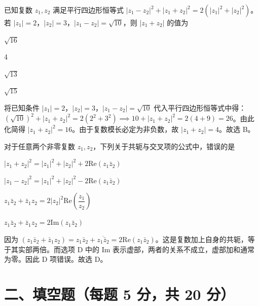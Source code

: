 \documentclass{exam-zh}
\begin{document}
\begin{question}[points=5]
  已知复数 $z_1, z_2$ 满足平行四边形恒等式 $|z_1 - z_2|^2 + |z_1 + z_2|^2 = 2(|z_1|^2 + |z_2|^2)$。若 $|z_1| = 2$，$|z_2| = 3$，$|z_1 - z_2| = \sqrt{10}$，则 $|z_1 + z_2|$ 的值为
  \begin{choices}
    \item $\sqrt{16}$
    \item 4
    \item $\sqrt{13}$
    \item $\sqrt{15}$
  \end{choices}
  \paren[B]
  \begin{solutionblock}
    将已知条件 $|z_1| = 2$，$|z_2| = 3$，$|z_1 - z_2| = \sqrt{10}$ 代入平行四边形恒等式中得：$(\sqrt{10})^2 + |z_1 + z_2|^2 = 2(2^2 + 3^2) \implies 10 + |z_1 + z_2|^2 = 2(4 + 9) = 26$。由此化简得 $|z_1 + z_2|^2 = 16$。由于复数模长必定为非负数，故 $|z_1 + z_2| = 4$。故选 B。
  \end{solutionblock}
\end{question}



\begin{question}[points=5]
  对于任意两个非零复数 $z_1, z_2$，下列关于共轭与交叉项的公式中，错误的是
  \begin{choices}
    \item $|z_1 + z_2|^2 = |z_1|^2 + |z_2|^2 + 2\mathrm{Re}(z_1\bar{z}_2)$
    \item $|z_1 - z_2|^2 = |z_1|^2 + |z_2|^2 - 2\mathrm{Re}(z_1\bar{z}_2)$
    \item $z_1\bar{z}_2 + \bar{z}_1z_2 = 2|z_2|^2\mathrm{Re}\left(\dfrac{z_1}{z_2}\right)$
    \item $z_1\bar{z}_2 + \bar{z}_1z_2 = 2\mathrm{Im}(z_1\bar{z}_2)$
  \end{choices}
  \paren[D]
  \begin{solutionblock}
    因为 $(z_1\bar{z}_2 + \bar{z}_1z_2) = z_1\bar{z}_2 + \overline{z_1\bar{z}_2} = 2\mathrm{Re}(z_1\bar{z}_2)$。这是复数加上自身的共轭，等于其实部两倍。而选项 D 中的 $\mathrm{Im}$ 表示虚部，两者的关系不成立，虚部加和通常为零。因此 D 项错误。故选 D。
  \end{solutionblock}
\end{question}


\section*{二、填空题（每题 5 分，共 20 分）}
\end{document}
